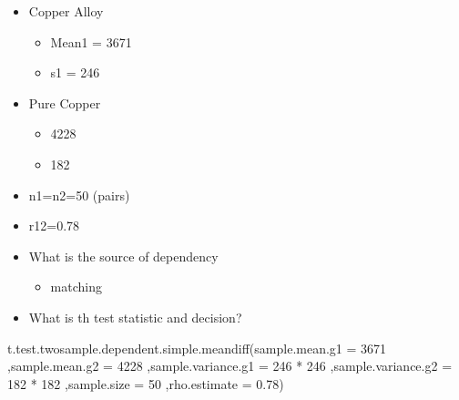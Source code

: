 \documentclass[
]{article}
\newenvironment{Shaded}{\begin{snugshade}}{\end{snugshade}}
\newcommand{\AttributeTok}[1]{\textcolor[rgb]{0.77,0.63,0.00}{#1}}
\newcommand{\DecValTok}[1]{\textcolor[rgb]{0.00,0.00,0.81}{#1}}
\newcommand{\FloatTok}[1]{\textcolor[rgb]{0.00,0.00,0.81}{#1}}
\newcommand{\FunctionTok}[1]{\textcolor[rgb]{0.00,0.00,0.00}{#1}}
\newcommand{\NormalTok}[1]{#1}
\newcommand{\SpecialCharTok}[1]{\textcolor[rgb]{0.00,0.00,0.00}{#1}}
\providecommand{\tightlist}{%
  \setlength{\itemsep}{0pt}\setlength{\parskip}{0pt}}
\begin{document}
\begin{itemize}
\item
  Copper Alloy

  \begin{itemize}
  \tightlist
  \item
    Mean1 = 3671
  \item
    s1 = 246
  \end{itemize}
\item
  Pure Copper

  \begin{itemize}
  \tightlist
  \item
    4228
  \item
    182
  \end{itemize}
\item
  n1=n2=50 (pairs)
\item
  r12=0.78
\item
  What is the source of dependency

  \begin{itemize}
  \tightlist
  \item
    matching
  \end{itemize}
\item
  What is th test statistic and decision?
\end{itemize}

\begin{Shaded}
\begin{Highlighting}[]
\FunctionTok{t.test.twosample.dependent.simple.meandiff}\NormalTok{(}\AttributeTok{sample.mean.g1 =} \DecValTok{3671}
\NormalTok{                                              ,}\AttributeTok{sample.mean.g2 =} \DecValTok{4228}
\NormalTok{                                              ,}\AttributeTok{sample.variance.g1 =} \DecValTok{246} \SpecialCharTok{*} \DecValTok{246}
\NormalTok{                                              ,}\AttributeTok{sample.variance.g2 =} \DecValTok{182} \SpecialCharTok{*} \DecValTok{182}
\NormalTok{                                              ,}\AttributeTok{sample.size =} \DecValTok{50}
\NormalTok{                                              ,}\AttributeTok{rho.estimate =} \FloatTok{0.78}\NormalTok{)}
\end{Highlighting}
\end{Shaded}
\end{document}
